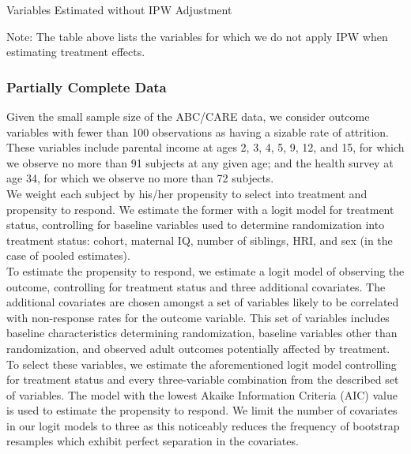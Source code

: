 \begin{table}[H]
\begin{threeparttable}
\caption{Variables Estimated without IPW Adjustment}
\label{table:nonipw}
\centering

\begin{tablenotes}
\footnotesize
\item Note: The table above lists the variables for which we do not apply IPW when estimating
treatment effects.
\end{tablenotes}
\end{threeparttable}
\end{table}


\subsubsection{Partially Complete Data}
\label{app:method_partialobs}

\noindent Given the small sample size of the ABC/CARE data, we consider outcome variables with fewer than 100 observations
as having a sizable rate of attrition. These variables include parental income at ages 2, 3, 4, 5, 9, 12,
and 15, for which we observe no more than 91 subjects at any given age; and the health survey at
age 34, for which we observe no more than 72 subjects. \\

\noindent We weight each subject by
his/her propensity to select into treatment and propensity to respond. We estimate the
former with a logit model for treatment status, controlling for baseline
variables used to determine randomization into treatment status: cohort,
maternal IQ, number of siblings, HRI, and sex (in the case of pooled estimates). \\

\noindent To estimate the propensity to respond, we estimate a logit model of observing the outcome,
controlling for treatment status and three additional covariates. The additional covariates are
chosen amongst a set of variables likely to be correlated with non-response rates for the outcome variable.
This set of variables includes baseline characteristics determining randomization,
baseline variables other than randomization, and observed adult outcomes potentially affected by
treatment. To select these variables, we estimate the
aforementioned logit model controlling for treatment status and every three-variable combination from
the described set of variables. The model with the lowest Akaike Information Criteria (AIC) value is used to estimate the propensity
to respond. We limit the number of covariates in our logit models to three as this noticeably reduces the frequency of bootstrap resamples which exhibit perfect separation in the covariates. \\

